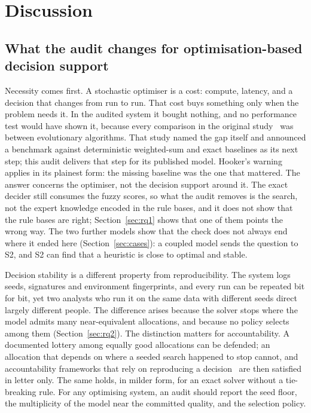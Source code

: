 \documentclass[systems,article,submit,moreauthors,pdftex]{Definitions/mdpi}
\begin{document}
\section{Discussion}\label{sec:discussion}

\subsection{What the audit changes for optimisation-based decision support}
Necessity comes first. A stochastic optimiser is a cost: compute, latency, and a decision
that changes from run to run. That cost buys something only when the problem needs it. In the
audited system it bought nothing, and no performance test would have shown it, because every
comparison in the original study~\cite{rabiei2026resilient} was between evolutionary algorithms.
That study named the gap itself and announced a benchmark against deterministic weighted-sum and
exact baselines as its next step; this audit delivers that step for its published model.
Hooker's warning~\cite{hooker1995testing} applies in its plainest form: the missing baseline was
the one that mattered. The answer concerns the optimiser, not the decision support around it.
The exact decider still consumes the fuzzy scores, so what the audit removes is the search, not
the expert knowledge encoded in the rule bases, and it does not show that the rule bases are
right; Section~\ref{sec:rq1} shows that one of them points the wrong way. The two further models
show that the check does not always end where it ended here (Section~\ref{sec:cases}): a coupled
model sends the question to S2, and S2 can find that a heuristic is close to optimal and stable.

Decision stability is a different property from reproducibility. The system logs seeds,
signatures and environment fingerprints, and every run can be repeated bit for bit, yet two
analysts who run it on the same data with different seeds direct largely different people. The
difference arises because the solver stops where the model admits many near-equivalent
allocations, and because no policy selects among them (Section~\ref{sec:rq2}). The distinction matters for
accountability. A documented lottery among equally good allocations can be defended; an
allocation that depends on where a seeded search happened to stop cannot, and accountability
frameworks that rely on reproducing a decision~\cite{kroll2017accountable} are then satisfied in
letter only. The same holds, in milder form, for an exact solver without a tie-breaking rule. For
any optimising system, an audit should report the seed floor, the multiplicity of the model near
the committed quality, and the selection policy.
\end{document}
